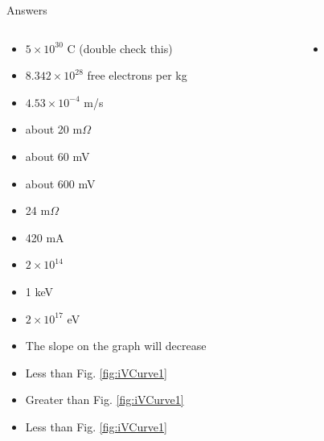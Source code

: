 \documentclass{beamer}
\begin{document}
\begin{frame}{Answers}
\tiny
\begin{columns}[T]
\begin{column}{0.5\textwidth}
\begin{itemize}
\item $5 \times 10^{30}$ C (double check this)
\item $8.342 \times 10^{28}$ free electrons per kg
\item $4.53 \times 10^{-4}$ m/s
\item about 20 m$\Omega$
\item about 60 mV
\item about 600 mV
\item 24 m$\Omega$
\item 420 mA
\item $2 \times 10^{14}$
\item 1 keV
\item $2 \times 10^{17}$ eV
\item The slope on the graph will decrease
\item Less than Fig. \ref{fig:iVCurve1}
\item Greater than Fig. \ref{fig:iVCurve1}
\item Less than Fig. \ref{fig:iVCurve1}
\end{itemize}
\end{column}
\begin{column}{0.5\textwidth}
\begin{itemize}
\item 
\end{itemize}
\end{column}
\end{columns}
\end{frame}
\end{document}
